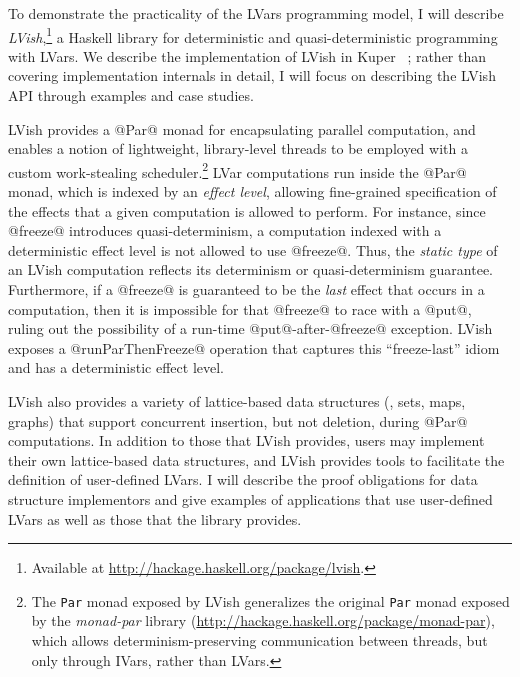 To demonstrate the practicality of the LVars programming model, I will
describe \emph{LVish},\footnote{Available at
  \url{http://hackage.haskell.org/package/lvish}.} a Haskell library
for deterministic and quasi-deterministic programming with LVars.  We
describe the implementation of LVish in Kuper
\etal~\cite{Freeze-paper}; rather than covering implementation
internals in detail, I will focus on describing the LVish API through
examples and case studies.

LVish provides a @Par@ monad for encapsulating parallel computation,
and enables a notion of lightweight, library-level threads to be
employed with a custom work-stealing scheduler.\footnote{The
  \lstinline|Par| monad exposed by LVish generalizes the original
  \lstinline|Par| monad exposed by the \emph{monad-par} library
  ({\url{http://hackage.haskell.org/package/monad-par}}), which allows
  determinism-preserving communication between threads, but only
  through IVars, rather than LVars.}  LVar computations run inside the
@Par@ monad, which is indexed by an \emph{effect level}, allowing
fine-grained specification of the effects that a given computation is
allowed to perform.  For instance, since @freeze@ introduces
quasi-determinism, a computation indexed with a deterministic effect
level is not allowed to use @freeze@.  Thus, the \emph{static type} of
an LVish computation reflects its determinism or quasi-determinism
guarantee.  Furthermore, if a @freeze@ is guaranteed to be the
\emph{last} effect that occurs in a computation, then it is impossible
for that @freeze@ to race with a @put@, ruling out the possibility of
a run-time @put@-after-@freeze@ exception.  LVish exposes a
@runParThenFreeze@ operation that captures this ``freeze-last'' idiom
and has a deterministic effect level.

LVish also provides a variety of lattice-based data structures (\eg,
sets, maps, graphs) that support concurrent insertion, but not
deletion, during @Par@ computations.  In addition to those that LVish
provides, users may implement their own lattice-based data structures,
and LVish provides tools to facilitate the definition of user-defined
LVars.  I will describe the proof obligations for data structure
implementors and give examples of applications that use user-defined
LVars as well as those that the library provides.

